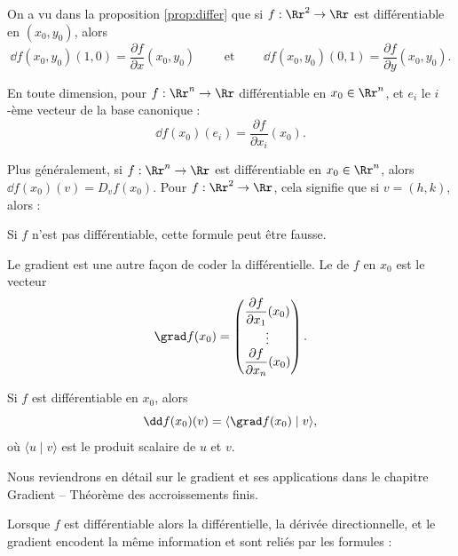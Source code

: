 \bigskip
{}

On a vu dans la proposition \ref{prop:differ} que si $f : \Rr^2 \to \Rr$ est différentiable en $(x_0,y_0)$, alors
$$\dd f (x_0,y_0) (1,0) = \frac{\partial f}{\partial x}(x_0,y_0)
\qquad \text{ et } \qquad
\dd f (x_0,y_0) (0,1) = \frac{\partial f}{\partial y}(x_0,y_0).$$

En toute dimension, pour $f : \Rr^n \to \Rr$ différentiable en $x_0 \in \Rr^n$, et $e_i$ le $i$-ème vecteur de la base canonique :
$$\dd f (x_0) (e_i) = \frac{\partial f}{\partial x_i}(x_0).$$



\bigskip
{}

Plus généralement, si $f : \Rr^n \to \Rr$ est différentiable en $x_0 \in \Rr^n$, alors $\dd f (x_0) (v) = D_v f(x_0)$.
Pour $f : \Rr^2 \to \Rr$, cela signifie que si $v=(h,k)$, alors :

Si $f$ n'est pas différentiable, cette formule peut être fausse.

\bigskip
{}

Le gradient est une autre façon de coder la différentielle.
Le  de $f$ en $x_0$ est le vecteur
$$\grad f (x_0) =
\begin{pmatrix}
	\dfrac{\partial f}{\partial x_{1}} (x_0)\\
	\vdots \\
	\dfrac{\partial f}{\partial x_n}(x_0)
\end{pmatrix}.$$

Si $f$ est différentiable en $x_0$, alors
$$\dd f (x_0) (v) = \langle \grad f (x_0) \mid v \rangle,$$
où $\langle u \mid v \rangle$ est le produit scalaire de $u$ et $v$.

Nous reviendrons en détail sur le gradient et ses applications dans le chapitre \og{}Gradient -- Théorème des accroissements finis\fg{}.


\bigskip
{}

Lorsque $f$ est différentiable alors la différentielle, la dérivée directionnelle, et le gradient encodent la même information et sont reliés  
par les formules :



